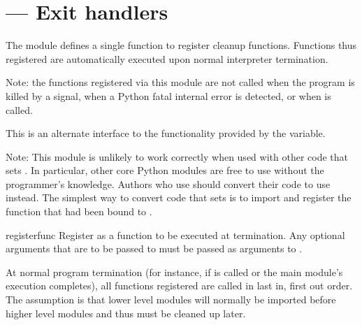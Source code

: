 \section{ ---
         Exit handlers}



The  module defines a single function to register
cleanup functions.  Functions thus registered are automatically
executed upon normal interpreter termination.

Note: the functions registered via this module are not called when the program is killed by a
signal, when a Python fatal internal error is detected, or when
 is called.

This is an alternate interface to the functionality provided by the
 variable.

Note: This module is unlikely to work correctly when used with other code
that sets .  In particular, other core Python modules are
free to use  without the programmer's knowledge.  Authors who
use  should convert their code to use
 instead.  The simplest way to convert code that sets
 is to import  and register the function
that had been bound to .

\begin{funcdesc}{register}{func}
Register  as a function to be executed at termination.  Any
optional arguments that are to be passed to  must be passed
as arguments to .

At normal program termination (for instance, if
 is called or the main module's execution
completes), all functions registered are called in last in, first out
order.  The assumption is that lower level modules will normally be
imported before higher level modules and thus must be cleaned up
later.
\end{funcdesc}


\begin{seealso}
\end{seealso}


